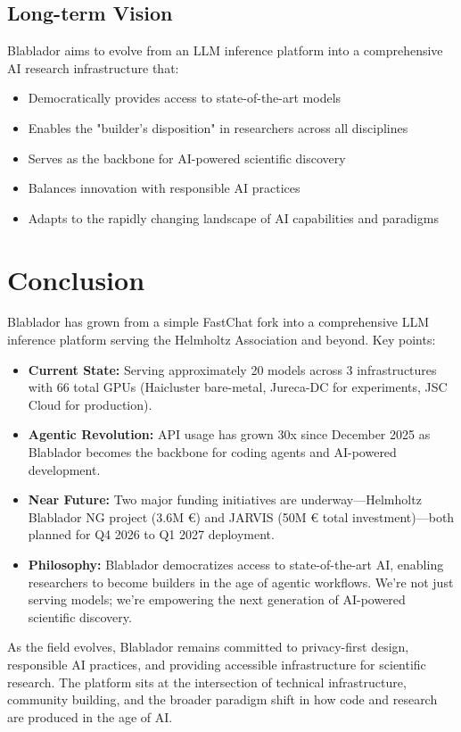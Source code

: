 \documentclass[10pt,conference]{IEEEtran}
\begin{document}
\subsection{Long-term Vision}
Blablador aims to evolve from an LLM inference platform into a comprehensive AI research infrastructure that:
\begin{itemize}
    \item Democratically provides access to state-of-the-art models
    \item Enables the "builder's disposition" in researchers across all disciplines
    \item Serves as the backbone for AI-powered scientific discovery
    \item Balances innovation with responsible AI practices
    \item Adapts to the rapidly changing landscape of AI capabilities and paradigms
\end{itemize}

\section{Conclusion}
Blablador has grown from a simple FastChat fork into a comprehensive LLM inference platform serving the Helmholtz Association and beyond. Key points:

\begin{itemize}
    \item \textbf{Current State:} Serving approximately 20 models across 3 infrastructures with 66 total GPUs (Haicluster bare-metal, Jureca-DC for experiments, JSC Cloud for production).
    
    \item \textbf{Agentic Revolution:} API usage has grown 30x since December 2025 as Blablador becomes the backbone for coding agents and AI-powered development.
    
    \item \textbf{Near Future:} Two major funding initiatives are underway—Helmholtz Blablador NG project (3.6M €) and JARVIS (50M € total investment)—both planned for Q4 2026 to Q1 2027 deployment.
    
    \item \textbf{Philosophy:} Blablador democratizes access to state-of-the-art AI, enabling researchers to become builders in the age of agentic workflows. We're not just serving models; we're empowering the next generation of AI-powered scientific discovery.
\end{itemize}

As the field evolves, Blablador remains committed to privacy-first design, responsible AI practices, and providing accessible infrastructure for scientific research. The platform sits at the intersection of technical infrastructure, community building, and the broader paradigm shift in how code and research are produced in the age of AI.



\end{document}
